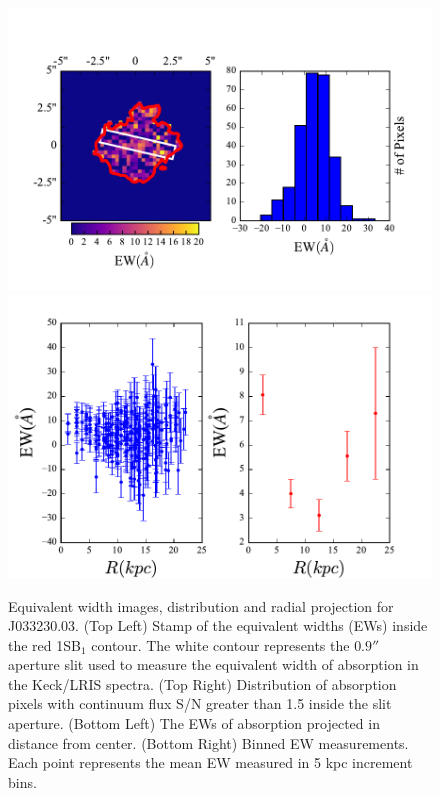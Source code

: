 \documentclass[twocolumn]{aastex61}
\begin{document}
\begin{figure}[]
\centering
\includegraphics[scale=0.9]{../Figures/J03EW.pdf}
\includegraphics[scale=0.9]{../Figures/J03EW_2.pdf}
\caption{Equivalent width images, distribution and radial projection for J033230.03. (Top Left) Stamp of the equivalent widths (EWs) inside the red 1SB$_1$ contour. The white contour represents the $0.9''$ aperture slit used to measure the equivalent width of absorption in the Keck/LRIS spectra. (Top Right) Distribution of absorption pixels with continuum flux S/N greater than 1.5 inside the slit aperture. (Bottom Left) The EWs of absorption projected in distance from center. (Bottom Right) Binned EW measurements. Each point represents the mean EW measured in 5 kpc increment bins. }
\label{fig:ew33}
\end{figure}
\end{document}
